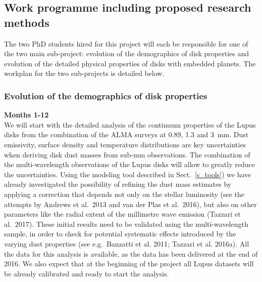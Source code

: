 \documentclass[10pt,fleqn,twoside]{article}
\begin{document}
\subsection{Work programme including proposed research methods}
\label{s_work}





The two PhD students hired for this project will each be responsible for one of the two main sub-project:
evolution of the demographics of disk properties and evolution of the detailed physical properties of disks with embedded planets. The workplan for the two sub-projects is detailed below.

\subsubsection{Evolution of the demographics of disk properties}

{\Tcol\bf Months 1-12}\\

We will start with the detailed analysis of the continuum properties of the Lupus disks from the combination of the ALMA surveys at 0.89, 1.3 and 3~mm. Dust emissivity, surface density and temperature
distributions are key uncertainties when deriving disk dust masses from sub-mm observations. The combination of the multi-wavelength observations of the Lupus disks will allow to greatly reduce the 
uncertainties. Using the modeling tool described in Sect.~\ref{s_tools}) we have already investigated the
possibility of refining the dust mass estimates by applying a correction that depends not only on the stellar luminosity (see the attempts by Andrews et al.~2013 and van der Plas et al.~2016), but also on other parameters like the radial extent of the millimetre wave emission (Tazzari et al.~2017). These initial results need to be validated using the multi-wavelength sample, in order to check for potential systematic effects introduced by the varying dust properties (see e.g.\ Banzatti et al. 2011; Tazzari et al. 2016a). All the data for this analysis is available, as the data has been delivered at the end of 2016. We also expect that at the beginning of the project all Lupus datasets will be already calibrated and ready to start the analysis.
\end{document}

